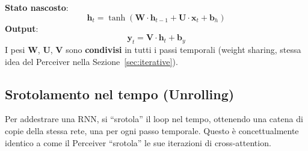 \documentclass[12pt,a4paper]{article}
\begin{document}
\begin{formulabox}
\textbf{Stato nascosto}:
\[
    \mathbf{h}_t = \tanh\!\left(\mathbf{W} \cdot \mathbf{h}_{t-1} + \mathbf{U} \cdot \mathbf{x}_t + \mathbf{b}_h\right)
\]
\textbf{Output}:
\[
    \mathbf{y}_t = \mathbf{V} \cdot \mathbf{h}_t + \mathbf{b}_y
\]
I pesi $\mathbf{W}$, $\mathbf{U}$, $\mathbf{V}$ sono \textbf{condivisi} in tutti i passi temporali (weight sharing, stessa idea del Perceiver nella Sezione~\ref{sec:iterative}).
\end{formulabox}

\subsection{Srotolamento nel tempo (Unrolling)}

Per addestrare una RNN, si ``srotola'' il loop nel tempo, ottenendo una catena di copie della stessa rete, una per ogni passo temporale. Questo \`e concettualmente identico a come il Perceiver ``srotola'' le sue iterazioni di cross-attention.
\end{document}
